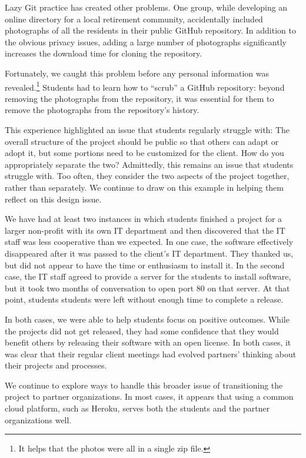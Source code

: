 Lazy Git practice has created other problems.  One group, while
developing an online directory for a local retirement community,
accidentally included photographs of all the residents in their
public GitHub repository.  In addition to the obvious privacy issues,
adding a large number of photographs significantly increases
the download time for cloning the repository.

Fortunately, we caught this problem before any personal information
was revealed.\footnote{It helps that the photos were all in a single
zip file.}  Students had to learn how to ``scrub'' a GitHub repository:
beyond removing the photographs from the repository, it was essential
for them to remove the photographs from the repository's history.

This experience highlighted an issue that students regularly struggle
with: The overall structure of the project should be public so that
others can adapt or adopt it, but some portions need to be customized
for the client.  How do you appropriately separate the two?
Admittedly, this remains an issue that students struggle with. Too
often, they consider the two aspects of the project together, rather
than separately.  We continue to draw on this example in helping them
reflect on this design issue.

We have
had at least two instances in which students finished a project for
a larger non-profit with its own IT department and then discovered
that the IT staff was less cooperative than we expected.  In one
case, the software effectively disappeared after it was passed to
the client's IT department.  They thanked us, but did not appear
to have the time or enthusiasm to install it.  In the second case,
the IT staff agreed to provide a server for the students to install
software, but it took two months of conversation to open port 80 on
that server.  At that point, students students were left without enough
time to complete a release.

In both cases, we were able to help students focus on positive
outcomes.  While the projects did not get released, they had some
confidence that they would benefit others by releasing their software
with an open license. In both cases, it was clear that their
regular client meetings had evolved partners' thinking about their
projects and processes.

We continue to explore ways to handle this broader issue of
transitioning the project to partner organizations.  In most cases,
it appears that using a common cloud platform, such as Heroku,
serves both the students and the partner organizations well.

